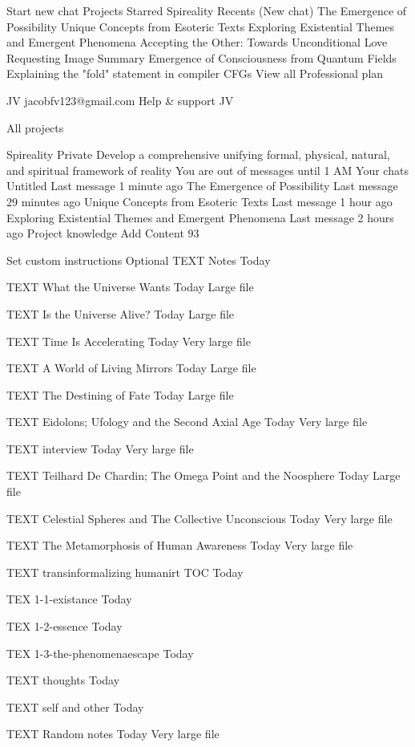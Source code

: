 

Start new chat
Projects
Starred
Spireality
Recents
(New chat)
The Emergence of Possibility
Unique Concepts from Esoteric Texts
Exploring Existential Themes and Emergent Phenomena
Accepting the Other: Towards Unconditional Love
Requesting Image Summary
Emergence of Consciousness from Quantum Fields
Explaining the "fold" statement in compiler CFGs
View all
Professional plan

JV
jacobfv123@gmail.com
Help & support
JV

All projects


Spireality
Private
Develop a comprehensive unifying formal, physical, natural, and spiritual framework of reality
You are out of messages until 1 AM
Your chats
Untitled
Last message 1 minute ago
The Emergence of Possibility
Last message 29 minutes ago
Unique Concepts from Esoteric Texts
Last message 1 hour ago
Exploring Existential Themes and Emergent Phenomena
Last message 2 hours ago
Project knowledge
Add Content
93%

Set custom instructions
Optional
TEXT
Notes
Today

TEXT
What the Universe Wants
Today
Large file

TEXT
Is the Universe Alive?
Today
Large file

TEXT
Time Is Accelerating
Today
Very large file

TEXT
A World of Living Mirrors
Today
Large file

TEXT
The Destining of Fate
Today
Large file

TEXT
Eidolons; Ufology and the Second Axial Age
Today
Very large file

TEXT
interview
Today
Very large file

TEXT
Teilhard De Chardin; The Omega Point and the Noosphere
Today
Large file

TEXT
Celestial Spheres and The Collective Unconscious
Today
Very large file

TEXT
The Metamorphosis of Human Awareness
Today
Very large file

TEXT
transinformalizing humanirt TOC
Today

TEX
1-1-existance
Today

TEX
1-2-essence
Today

TEX
1-3-the-phenomenaescape
Today

TEXT
thoughts
Today

TEXT
self and other
Today

TEXT
Random notes
Today
Very large file

